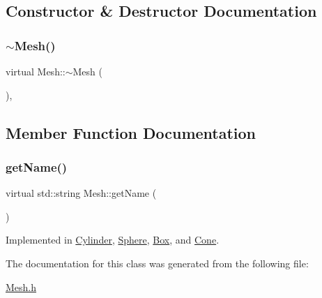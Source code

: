 \subsection{Constructor \& Destructor Documentation}
\mbox{\label{class_mesh_ad6a041191ed55c693254e945ce2869ff}} 
\subsubsection{\texorpdfstring{$\sim$Mesh()}{~Mesh()}}
{\footnotesize\ttfamily virtual Mesh\+::$\sim$\+Mesh (\begin{DoxyParamCaption}{ }\end{DoxyParamCaption})\hspace{0.3cm}{\ttfamily [inline]}, {\ttfamily [virtual]}}



\subsection{Member Function Documentation}
\mbox{\label{class_mesh_aa131fe1c2586fe60988155db77c57272}} 
\subsubsection{\texorpdfstring{getName()}{getName()}}
{\footnotesize\ttfamily virtual std\+::string Mesh\+::get\+Name (\begin{DoxyParamCaption}{ }\end{DoxyParamCaption})\hspace{0.3cm}{\ttfamily [pure virtual]}}



Implemented in \mbox{\hyperlink{class_cylinder_afdb7f76b3f02471d638c36127395d181}{Cylinder}}, \mbox{\hyperlink{class_sphere_a173e667086ecd8b9d972e1d6f9885d9d}{Sphere}}, \mbox{\hyperlink{class_box_ac8792393d053c6cac65a36e5c1f27f15}{Box}}, and \mbox{\hyperlink{class_cone_a9581010134e3d1fe079fe5cce1933786}{Cone}}.



The documentation for this class was generated from the following file\+:\begin{DoxyCompactItemize}
\item 
\mbox{\hyperlink{_mesh_8h}{Mesh.\+h}}\end{DoxyCompactItemize}
